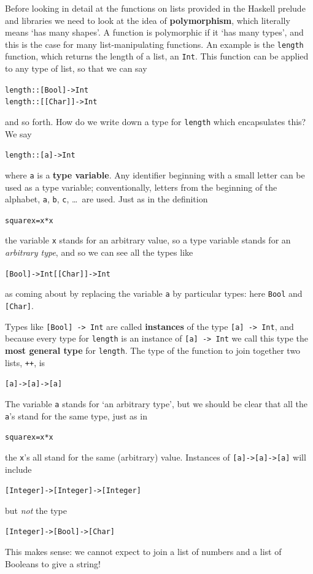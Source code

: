 Before looking in detail at the functions on lists provided in the
Haskell prelude and libraries
we need to look at the idea of
\textbf{polymorphism}, which literally means `has many shapes'. A
function is polymorphic if it `has many types', and this is the case
for many list-manipulating functions. An example is the
\texttt{length}
function, which returns the length of a list, an \texttt{Int}. This function
can be applied to any
type of list, so that we can say
\begin{alltt}
length :: [Bool] -> Int
length :: [[Char]] -> Int
\end{alltt}
and so forth.
How do we write down a type for \texttt{length} which encapsulates this?
We say
\begin{alltt}
length :: [a] -> Int
\end{alltt}
where \texttt{a} is a \textbf{type variable}. Any identifier beginning with a small letter
can be used as a type variable;  conventionally, letters from the beginning of the
alphabet, \texttt{a}, \texttt{b}, \texttt{c}, \ldots\ are
used.
Just as in the definition
\begin{alltt}
square x = x*x
\end{alltt}
the variable \texttt{x} stands for an arbitrary value, 
so a type variable stands for an {\em
arbitrary type}, and so we can see all the types like 
\begin{alltt}
[Bool] -> Int          [[Char]] -> Int
\end{alltt}
as coming about by replacing the variable \texttt{a} by particular
types: here \texttt{Bool} and \texttt{[Char]}. 

Types like \texttt{[Bool] -> Int}
are called \textbf{instances} of the type
\texttt{[a] -> Int}, and because every type for \texttt{length} is an instance of
\texttt{[a] -> Int} we call this type the \textbf{most general type}
 for \texttt{length}.
The type of the function to join together two lists, \texttt{++}, is 
\begin{alltt}\minx{++}
[a] -> [a] -> [a]
\end{alltt} 
The variable \texttt{a} stands for `an arbitrary type', but we should be
clear that all the \texttt{a}'s stand for the same type, just as in 
\begin{alltt}
square x = x*x
\end{alltt}
the \texttt{x}'s all stand for the same (arbitrary) value. Instances of
\texttt{[a]->[a]->[a]} will include 
\begin{alltt}
[Integer]->[Integer]->[Integer]
\end{alltt}
but {\em not\/} the type
\begin{alltt}
[Integer]->[Bool]->[Char]
\end{alltt}
This makes sense: we cannot expect to join a list of numbers and a list
of Booleans to give a string!

